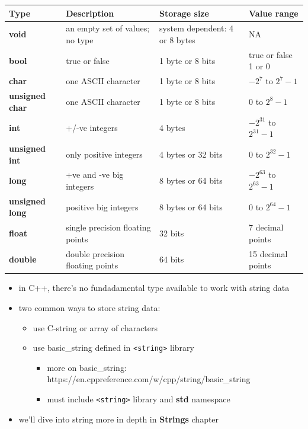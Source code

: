 \documentclass[11pt]{article}
\providecommand{\tightlist}{%
      \setlength{\itemsep}{0pt}\setlength{\parskip}{0pt}}
\begin{document}
\begin{longtable}[]{@{}llll@{}}
\toprule
Type & Description & Storage size & Value range \\
\midrule
\endhead
\textbf{void} & an empty set of values; no type & system dependent: 4 or
8 bytes & NA \\
\textbf{bool} & true or false & 1 byte or 8 bits & true or false 1 or
0 \\
\textbf{char} & one ASCII character & 1 byte or 8 bits & \(-2^7\) to
\(2^7-1\) \\
\textbf{unsigned char} & one ASCII character & 1 byte or 8 bits & 0 to
\(2^8-1\) \\
\textbf{int} & +/-ve integers & 4 bytes & \(-2^{31}\) to \(2^{31}-1\) \\
\textbf{unsigned int} & only positive integers & 4 bytes or 32 bits & 0
to \(2^{32}-1\) \\
\textbf{long} & +ve and -ve big integers & 8 bytes or 64 bits &
\(-2^{63}\) to \(2^{63}-1\) \\
\textbf{unsigned long} & positive big integers & 8 bytes or 64 bits & 0
to \(2^{64}-1\) \\
\textbf{float} & single precision floating points & 32 bits & 7 decimal
points \\
\textbf{double} & double precision floating points & 64 bits & 15
decimal points \\
\bottomrule
\end{longtable}

\begin{itemize}
\tightlist
\item
  in C++, there's no fundadamental type available to work with string
  data
\item
  two common ways to store string data:

  \begin{itemize}
  \tightlist
  \item
    use C-string or array of characters
  \item
    use basic\_string defined in
    \texttt{\textless{}string\textgreater{}} library

    \begin{itemize}
    \tightlist
    \item
      more on basic\_string:
      https://en.cppreference.com/w/cpp/string/basic\_string
    \item
      must include \texttt{\textless{}string\textgreater{}} library and
      \textbf{std} namespace
    \end{itemize}
  \end{itemize}
\item
  we'll dive into string more in depth in \textbf{Strings} chapter
\end{itemize}
\end{document}

